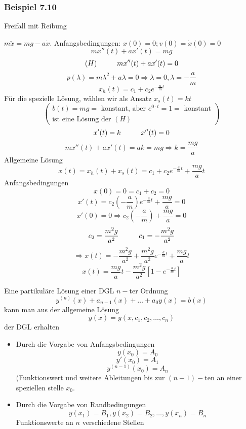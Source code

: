 \begin{enumerate}
\subsubsection*{Beispiel 7.10}
Freifall mit Reibung 
\begin{center}
\end{center}
$m\ddot{x}=mg-a\dot{x}$. Anfangsbedingungen: $x(0)=0; v(0)=\dot{x}(0)=0$
\[mx''(t)+ax'(t)=mg\]
\[(H)\hspace{10mm}mx''(t)+ax'(t)=0\]
\[p(\lambda)=m\lambda^2+a\lambda=0\Rightarrow \lambda=0,\lambda=-\frac{a}{m}\]
\[x_h(t)=c_1+c_2e^{-\frac{a}{m}t}\]
Für die spezielle Lösung, wählen wir als Ansatz $x_s(t)=kt$
\[\left( \begin{array}{l}
b(t) = mg = {\text{ konstant, aber  }}{e^{0 \cdot t}} = 1 = {\text{ konstant}}\\
{\text{ist eine Lösung der }}(H)
\end{array} \right)\]
\[x'(t)=k\hspace{10mm}x''(t)=0\]
\[mx''(t)+ax'(t)=ak=mg\Rightarrow k=\frac{mg}{a}\]
Allgemeine Lösung 
\[x(t)=x_h(t)+x_s(t)=c_1+c_2e^{-\frac{a}{m}t}+\frac{mg}{a}t\]
Anfangsbedingungen
\[x(0)=0=c_1+c_2=0\]
\[x'(t)=c_2\left(-\frac{a}{m}\right)e^{-\frac{a}{m}t}+\frac{mg}{a}=0\]
\[x'(0)=0\Rightarrow c_2\left( -\frac{a}{m}\right) +\frac{mg}{a}=0\]
\[c_2=\frac{m^2g}{a^2}\hspace{10mm}c_1=-\frac{m^2g}{a^2}\]
\[\Rightarrow x(t)=-\frac{m^2g}{a^2}+\frac{m^2g}{a^2}e^{-\frac{a}{m}t}+\frac{mg}{a}t\]
\[x(t)=\frac{mg}{a}t-\frac{m^2g}{a^2}\left[ 1-e^{-\frac{a}{m}t}\right]\]
\end{enumerate}
Eine partikuläre Lösung einer DGL $n-$ter Ordnung \[y^{(n)}{(x)}+a_{n-1}(x)+\dots+a_0 y(x)=b(x)\] kann man aus der allgemeine Lösung 
\[y(x)=y(x,c_1,c_2,\dots,c_n)\] der DGL erhalten
\begin{itemize}
\item Durch die Vorgabe von Anfangsbedingungen 
\[y(x_0)=A_0\]
\[y'(x_0)=A_1\]
\[y^{(n-1)}(x_0)=A_n\]
(Funktionswert und weitere Ableitungen bis zur $(n-1)-$ten an einer speziellen stelle $x_0$.
\item Durch die Vorgabe von Randbedingungen 
\[y(x_1)=B_1, y(x_2)=B_2, \dots, y(x_n)=B_n\] Funktionswerte an $n$ verschiedene Stellen
\end{itemize}
